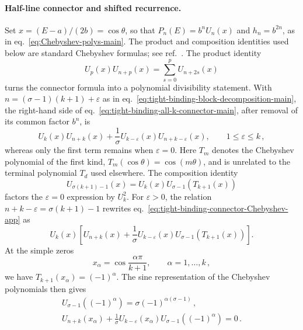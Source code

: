 \documentclass[a4paper,11pt]{article}
\theoremstyle{definition}
\theoremstyle{remark}
\begin{document}
\paragraph{Half-line connector and shifted recurrence.}
Set $x=(E-a)/(2b)=\cos\theta$, so that
$P_n(E)=b^nU_n(x)$ and $h_n=b^{2n}$, as in
eq.~\eqref{eq:Chebyshev-polys-main}. The product and composition identities used below are standard Chebyshev formulas; see ref.~\cite{DLMF}. The product identity
\begin{equation}
   U_p(x)U_{n+p}(x)
   =\sum_{s=0}^{p}U_{n+2s}(x)
   \label{eq:tight-binding-Chebyshev-product-app}
\end{equation}
turns the connector formula into a polynomial divisibility statement.
With $n=(\sigma-1)(k+1)+\varepsilon$ as in
eq.~\eqref{eq:tight-binding-block-decomposition-main}, the right-hand
side of eq.~\eqref{eq:tight-binding-all-k-connector-main}, after removal
of its common factor $b^n$, is
\begin{equation}
   U_k(x)U_{n+k}(x)
   +\frac{1}{\sigma}U_{k-\varepsilon}(x)
   U_{n+k-\varepsilon}(x),
   \qquad 1\le\varepsilon\le k\,,
   \label{eq:tight-binding-connector-Chebyshev-app}
\end{equation}
whereas only the first term remains when $\varepsilon=0$.  Here $T_m$ denotes the Chebyshev polynomial of the first kind, $T_m(\cos\theta)=\cos(m\theta)$, and is unrelated to the terminal polynomial $T_d$ used elsewhere. The
composition identity
\begin{equation}
   U_{\sigma(k+1)-1}(x)
   =
   U_k(x)U_{\sigma-1}\!\left(T_{k+1}(x)\right)
   \label{eq:tight-binding-Chebyshev-composition-app}
\end{equation}
factors the $\varepsilon=0$ expression by $U_k^2$.  For
$\varepsilon>0$, the relation
$n+k-\varepsilon=\sigma(k+1)-1$ rewrites
eq.~\eqref{eq:tight-binding-connector-Chebyshev-app} as
\begin{equation}
   U_k(x)\left[
      U_{n+k}(x)
      +\frac{1}{\sigma}U_{k-\varepsilon}(x)
      U_{\sigma-1}\!\left(T_{k+1}(x)\right)
   \right].
   \label{eq:tight-binding-first-factor-app}
\end{equation}
At the simple zeros
\begin{equation}
   x_\alpha=\cos\frac{\alpha\pi}{k+1},
   \qquad \alpha=1,\ldots,k\,,
\end{equation}
we have $T_{k+1}(x_\alpha)=(-1)^\alpha$.  The sine representation of
the Chebyshev polynomials then gives
\begin{equation}
\begin{gathered}
   U_{\sigma-1}\!\left((-1)^\alpha\right)
   =\sigma(-1)^{\alpha(\sigma-1)}\,,\\
   U_{n+k}(x_\alpha)
   +\frac{1}{\sigma}U_{k-\varepsilon}(x_\alpha)
   U_{\sigma-1}\!\left((-1)^\alpha\right)
   =0\,.
\end{gathered}
   \label{eq:tight-binding-root-cancellation-app}
\end{equation}
\end{document}
